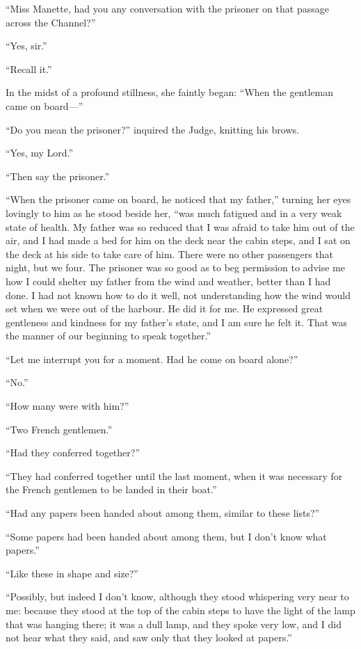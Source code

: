 ``Miss Manette, had you any conversation with the prisoner on that
passage across the Channel?''

``Yes, sir.''

``Recall it.''

In the midst of a profound stillness, she faintly began:  ``When the
gentleman came on board---''

``Do you mean the prisoner?'' inquired the Judge, knitting his brows.

``Yes, my Lord.''

``Then say the prisoner.''

``When the prisoner came on board, he noticed that my father,'' turning
her eyes lovingly to him as he stood beside her, ``was much fatigued
and in a very weak state of health.  My father was so reduced that I
was afraid to take him out of the air, and I had made a bed for him
on the deck near the cabin steps, and I sat on the deck at his side
to take care of him.  There were no other passengers that night, but
we four.  The prisoner was so good as to beg permission to advise me
how I could shelter my father from the wind and weather, better than
I had done.  I had not known how to do it well, not understanding how
the wind would set when we were out of the harbour.  He did it for me.
He expressed great gentleness and kindness for my father's state, and
I am sure he felt it.  That was the manner of our beginning to speak
together.''

``Let me interrupt you for a moment.  Had he come on board alone?''

``No.''

``How many were with him?''

``Two French gentlemen.''

``Had they conferred together?''

``They had conferred together until the last moment, when it was
necessary for the French gentlemen to be landed in their boat.''

``Had any papers been handed about among them, similar to these lists?''

``Some papers had been handed about among them, but I don't know what
papers.''

``Like these in shape and size?''

``Possibly, but indeed I don't know, although they stood whispering
very near to me:  because they stood at the top of the cabin steps to
have the light of the lamp that was hanging there; it was a dull lamp,
and they spoke very low, and I did not hear what they said, and saw
only that they looked at papers.''

